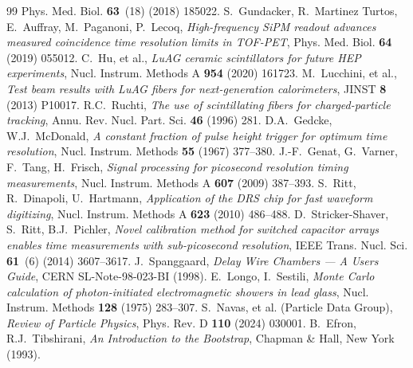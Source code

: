 \documentclass[final,5p,times,twocolumn]{elsarticle}
\begin{document}
\begin{thebibliography}{99}
Phys. Med. Biol. \textbf{63}~(18) (2018) 185022.
 S.~Gundacker, R.~Martinez Turtos, E.~Auffray, M.~Paganoni, P.~Lecoq,
\textit{High-frequency SiPM readout advances measured coincidence time resolution limits
in TOF-PET}, Phys. Med. Biol. \textbf{64} (2019) 055012.
 C.~Hu, et al., \textit{LuAG ceramic scintillators for future HEP
experiments}, Nucl. Instrum. Methods A \textbf{954} (2020) 161723.
 M.~Lucchini, et al., \textit{Test beam results with LuAG
fibers for next-generation calorimeters}, JINST \textbf{8} (2013) P10017.
 R.C.~Ruchti, \textit{The use of scintillating fibers for
charged-particle tracking}, Annu. Rev. Nucl. Part. Sci. \textbf{46} (1996) 281.
 D.A.~Gedcke, W.J.~McDonald, \textit{A constant fraction of pulse
height trigger for optimum time resolution}, Nucl. Instrum. Methods \textbf{55} (1967)
377--380.
 J.-F.~Genat, G.~Varner, F.~Tang, H.~Frisch, \textit{Signal
processing for picosecond resolution timing measurements}, Nucl. Instrum. Methods A
\textbf{607} (2009) 387--393.
 S.~Ritt, R.~Dinapoli, U.~Hartmann, \textit{Application of the DRS chip
for fast waveform digitizing}, Nucl. Instrum. Methods A \textbf{623} (2010) 486--488.
 D.~Stricker-Shaver, S.~Ritt, B.J.~Pichler, \textit{Novel calibration
method for switched capacitor arrays enables time measurements with sub-picosecond
resolution}, IEEE Trans. Nucl. Sci. \textbf{61}~(6) (2014) 3607--3617.
 J.~Spanggaard, \textit{Delay Wire Chambers --- A Users Guide},
CERN SL-Note-98-023-BI (1998).
 E.~Longo, I.~Sestili, \textit{Monte Carlo calculation of
photon-initiated electromagnetic showers in lead glass}, Nucl. Instrum. Methods
\textbf{128} (1975) 283--307.
 S.~Navas, et al. (Particle Data Group), \textit{Review of Particle
Physics}, Phys. Rev. D \textbf{110} (2024) 030001.
 B.~Efron, R.J.~Tibshirani, \textit{An Introduction to the Bootstrap},
Chapman \& Hall, New York (1993).
\end{thebibliography}
\end{document}
